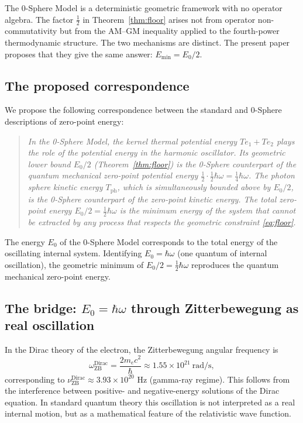 \documentclass[%
 reprint, amsmath,amssymb, aps, prb, ]{revtex4-2}
\numberwithin{equation}{section}
\begin{document}
The 0-Sphere Model is a deterministic geometric framework with no operator algebra. The factor $\tfrac{1}{2}$ in Theorem~\ref{thm:floor} arises not from operator non-commutativity but from the AM--GM inequality applied to the fourth-power thermodynamic structure. The two mechanisms are distinct. The present paper proposes that they give the same answer: $E_\text{min} = E_0/2$.

\subsection{The proposed correspondence}

We propose the following correspondence between the standard and 0-Sphere descriptions of zero-point energy:

\begin{quote}
\textit{In the 0-Sphere Model, the kernel thermal potential energy $Te_1 + Te_2$ plays the role of the potential energy in the harmonic oscillator. Its geometric lower bound $E_0/2$ (Theorem~\ref{thm:floor}) is the 0-Sphere counterpart of the quantum mechanical zero-point potential energy $\tfrac{1}{2} \cdot \tfrac{1}{2}\hbar\omega = \tfrac{1}{4}\hbar\omega$. The photon sphere kinetic energy $T_\text{ph}$, which is simultaneously bounded above by $E_0/2$, is the 0-Sphere counterpart of the zero-point kinetic energy. The total zero-point energy $E_0/2 = \tfrac{1}{2}\hbar\omega$ is the minimum energy of the system that cannot be extracted by any process that respects the geometric constraint \eqref{eq:floor}.}
\end{quote}

The energy $E_0$ of the 0-Sphere Model corresponds to the total energy of the oscillating internal system. Identifying $E_0 = \hbar\omega$ (one quantum of internal oscillation), the geometric minimum of $E_0/2 = \tfrac{1}{2}\hbar\omega$ reproduces the quantum mechanical zero-point energy.

\subsection{The bridge: $E_0 = \hbar\omega$ through Zitterbewegung as real oscillation}
\label{subsec:bridge}

In the Dirac theory of the electron, the Zitterbewegung angular frequency is
\begin{equation}
\omega_\text{ZB}^\text{Dirac} = \frac{2m_e c^2}{\hbar} \approx 1.55 \times 10^{21}\ \text{rad/s},
\label{eq:omZB_dirac}
\end{equation}
corresponding to $\nu_\text{ZB}^\text{Dirac} \approx 3.93\times10^{20}$ Hz (gamma-ray regime). This follows from the interference between positive- and negative-energy solutions of the Dirac equation. In standard quantum theory this oscillation is not interpreted as a real internal motion, but as a mathematical feature of the relativistic wave function.
\end{document}
